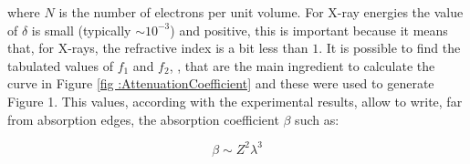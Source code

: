 \begin{flushleft}
where $N $ is the number of electrons per unit volume. For X-ray energies the value of $\delta $ is small (typically $\sim 10^{-3} $) and positive, this is important because it means that, for X-rays, the refractive index is a bit less than $1 $. It is possible to find the tabulated values of $f_1 $ and $f_2 $, \cite{henke1981atomic}, that are the main ingredient to calculate the curve in Figure \ref{fig :AttenuationCoefficient}  and these were used to generate Figure 1. This values, according with the experimental results, allow to write, far from absorption edges, the absorption coefficient $\beta $ such as:
\end{flushleft}

\begin{equation}
\beta \sim Z^2 \lambda^3
\label{eq: new beta}
\end{equation}


